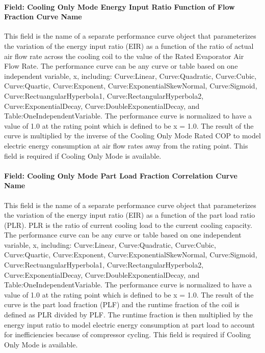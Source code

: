 \paragraph{Field: Cooling Only Mode Energy Input Ratio Function of Flow Fraction Curve Name}\label{field-cooling-only-mode-energy-input-ratio-function-of-flow-fraction-curve-name}

This field is the name of a separate performance curve object that parameterizes the variation of the energy input ratio (EIR) as a function of the ratio of actual air flow rate across the cooling coil to the value of the Rated Evaporator Air Flow Rate. The performance curve can be any curve or table based on one independent variable, x, including: Curve:Linear, Curve:Quadratic, Curve:Cubic, Curve:Quartic, Curve:Exponent, Curve:ExponentialSkewNormal, Curve:Sigmoid, Curve:RectuangularHyperbola1, Curve:RectangularHyperbola2, Curve:ExponentialDecay, Curve:DoubleExponentialDecay, and Table:OneIndependentVariable. The performance curve is normalized to have a value of 1.0 at the rating point which is defined to be x = 1.0. The result of the curve is multiplied by the inverse of the Cooling Only Mode Rated COP to model electric energy consumption at air flow rates away from the rating point. This field is required if Cooling Only Mode is available.

\paragraph{Field: Cooling Only Mode Part Load Fraction Correlation Curve Name}\label{field-cooling-only-mode-part-load-fraction-correlation-curve-name}

This field is the name of a separate performance curve object that parameterizes the variation of the energy input ratio (EIR) as a function of the part load ratio (PLR). PLR is the ratio of current cooling load to the current cooling capacity. The performance curve can be any curve or table based on one independent variable, x, including: Curve:Linear, Curve:Quadratic, Curve:Cubic, Curve:Quartic, Curve:Exponent, Curve:ExponentialSkewNormal, Curve:Sigmoid, Curve:RectuangularHyperbola1, Curve:RectangularHyperbola2, Curve:ExponentialDecay, Curve:DoubleExponentialDecay, and Table:OneIndependentVariable. The performance curve is normalized to have a value of 1.0 at the rating point which is defined to be x = 1.0. The result of the curve is the part load fraction (PLF) and the runtime fraction of the coil is defined as PLR divided by PLF. The runtime fraction is then multiplied by the energy input ratio to model electric energy consumption at part load to account for inefficiencies because of compressor cycling. This field is required if Cooling Only Mode is available.

